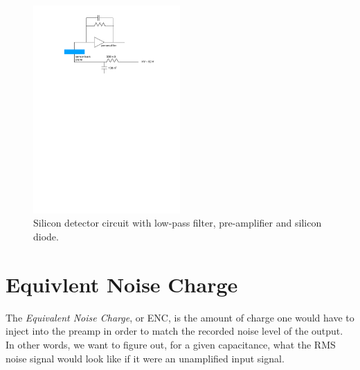 \documentclass[12pt]{article}
\begin{document}
\begin{figure}[htb]
  \centering
  \includegraphics[width=0.5\textwidth]{./graphics/SiliconDiodeCircuit}
  \caption{Silicon detector circuit with low-pass filter, pre-amplifier and silicon diode.}
  \label{fig:SiliconDiodeCircuit}
\end{figure}





\section{Equivlent Noise Charge}
The \textit{Equivalent Noise Charge}, or ENC, is the amount of charge one would have to inject into the preamp in order to match the recorded noise level of the output. In other words, we want to figure out, for a given capacitance, what the RMS noise signal would look like if it were an unamplified input signal.
\end{document}
